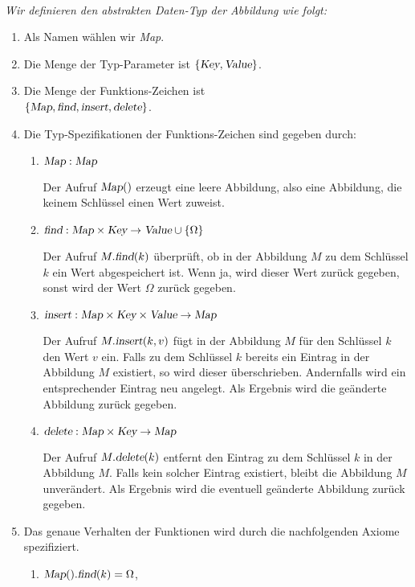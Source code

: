 \begin{Definition}[Abbildung] \hspace*{\fill} \\
{\em
  Wir definieren den abstrakten Daten-Typ der \emph{Abbildung} wie folgt:
  \begin{enumerate}
  \item Als Namen w\"ahlen wir \textsl{Map}.
  \item Die Menge der Typ-Parameter ist $\{ \textsl{Key}, \textsl{Value} \}$.
  \item Die Menge der Funktions-Zeichen ist \\[0.1cm]
       \hspace*{1.3cm} 
       $\{ \textsl{Map}, \textsl{find}, \textsl{insert}, \textsl{delete} \}$.
  \item Die Typ-Spezifikationen der Funktions-Zeichen sind gegeben durch:
        \begin{enumerate}
        \item $\textsl{Map}: \textsl{Map}$

              Der Aufruf $\textsl{Map}()$ erzeugt eine leere Abbildung, also
              eine Abbildung, die keinem Schl\"ussel einen Wert zuweist.
        \item $\textsl{find}: \textsl{Map} \times \textsl{Key} \rightarrow \textsl{Value} \cup \{\Omega\}$

              Der Aufruf $M.\textsl{find}(k)$ \"uberpr\"uft, ob in der Abbildung $M$
              zu dem Schl\"ussel $k$ ein Wert abgespeichert ist.  Wenn ja, wird dieser Wert
              zur\"uck gegeben, sonst wird der Wert $\Omega$ zur\"uck gegeben.
        \item $\textsl{insert}: \textsl{Map} \times \textsl{Key} \times \textsl{Value} \rightarrow \textsl{Map}$

              Der Aufruf $M.\textsl{insert}(k,v)$ f\"ugt in der Abbildung $M$
              f\"ur den Schl\"ussel $k$ den Wert $v$ ein.  Falls zu dem Schl\"ussel $k$ bereits
              ein Eintrag in der Abbildung $M$ existiert, so wird dieser \"uberschrieben.
              Andernfalls wird ein entsprechender Eintrag neu angelegt.
              Als Ergebnis wird die ge\"anderte Abbildung zur\"uck gegeben.
        \item $\textsl{delete}: \textsl{Map} \times \textsl{Key} \rightarrow \textsl{Map}$

              Der Aufruf $M.\textsl{delete}(k)$ entfernt den Eintrag zu dem Schl\"ussel $k$
              in der Abbildung $M$.  Falls kein solcher Eintrag existiert, bleibt die 
              Abbildung $M$ unver\"andert.  Als Ergebnis wird die eventuell ge\"anderte
              Abbildung zur\"uck gegeben.
        \end{enumerate}
  \item Das genaue Verhalten der Funktionen wird durch die nachfolgenden Axiome
        spezifiziert.
        \begin{enumerate}
        \item $\textsl{Map}().\textsl{find}(k) = \Omega$,


\end{enumerate}
\end{enumerate}}
\end{Definition}
